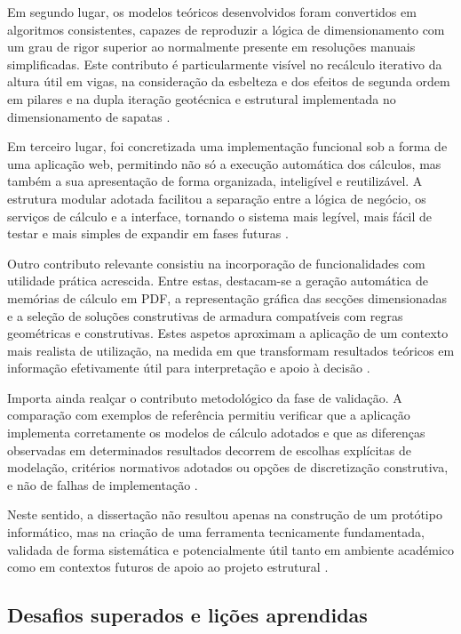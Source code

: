 Em segundo lugar, os modelos teóricos desenvolvidos foram convertidos em algoritmos consistentes, capazes de reproduzir a lógica de dimensionamento com um grau de rigor superior ao normalmente presente em resoluções manuais simplificadas. Este contributo é particularmente visível no recálculo iterativo da altura útil em vigas, na consideração da esbelteza e dos efeitos de segunda ordem em pilares e na dupla iteração geotécnica e estrutural implementada no dimensionamento de sapatas \cite{EN1992,Goodchild,Mosley}.

Em terceiro lugar, foi concretizada uma implementação funcional sob a forma de uma aplicação web, permitindo não só a execução automática dos cálculos, mas também a sua apresentação de forma organizada, inteligível e reutilizável. A estrutura modular adotada facilitou a separação entre a lógica de negócio, os serviços de cálculo e a interface, tornando o sistema mais legível, mais fácil de testar e mais simples de expandir em fases futuras \cite{DjangoDocs,PythonDocs}.

Outro contributo relevante consistiu na incorporação de funcionalidades com utilidade prática acrescida. Entre estas, destacam-se a geração automática de memórias de cálculo em PDF, a representação gráfica das secções dimensionadas e a seleção de soluções construtivas de armadura compatíveis com regras geométricas e construtivas. Estes aspetos aproximam a aplicação de um contexto mais realista de utilização, na medida em que transformam resultados teóricos em informação efetivamente útil para interpretação e apoio à decisão \cite{EN1992,DaileySVG,TikZManual}.

Importa ainda realçar o contributo metodológico da fase de validação. A comparação com exemplos de referência permitiu verificar que a aplicação implementa corretamente os modelos de cálculo adotados e que as diferenças observadas em determinados resultados decorrem de escolhas explícitas de modelação, critérios normativos adotados ou opções de discretização construtiva, e não de falhas de implementação \cite{Goodchild,Mosley,EN1992}.

Neste sentido, a dissertação não resultou apenas na construção de um protótipo informático, mas na criação de uma ferramenta tecnicamente fundamentada, validada de forma sistemática e potencialmente útil tanto em ambiente académico como em contextos futuros de apoio ao projeto estrutural \cite{DjangoDocs,PythonDocs,EN1992}.

\subsection{Desafios superados e lições aprendidas}

